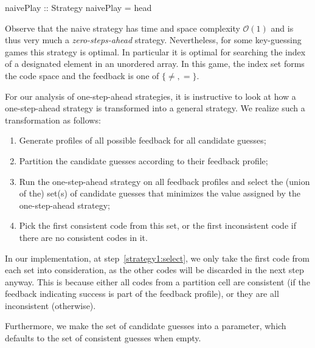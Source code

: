 \documentclass[a4paper]{article}
\theoremstyle{definition}
\newcommand{\bigO}{\mathcal{O}}
\begin{document}
\begin{code}
naivePlay :: Strategy
naivePlay = head
\end{code}

Observe that the naive strategy has time and space complexity $\bigO(1)$ and is thus very much a \emph{zero-steps-ahead} strategy.
Nevertheless, for some key-guessing games this strategy is optimal.
In particular it is optimal for searching the index of a designated element in an unordered array.
In this game, the index set forms the code space and the feedback is one of $\{\ne, =\}$.

For our analysis of one-step-ahead strategies, it is instructive to look at how a one-step-ahead strategy is transformed into a general strategy.
We realize such a transformation as follows:
\begin{enumerate}
\item
  Generate profiles of all possible feedback for all candidate guesses;
\item
  Partition the candidate guesses according to their feedback profile;
\item\label{strategy1:select}
  Run the one-step-ahead strategy on all feedback profiles and select the (union of the) set(s) of candidate guesses that minimizes the value assigned by the one-step-ahead strategy;
\item
  Pick the first consistent code from this set, or the first inconsistent code if there are no consistent codes in it.
\end{enumerate}

In our implementation, at step~\ref{strategy1:select}, we only take the first code from each set into consideration, as the other codes will be discarded in the next step anyway.
This is because either all codes from a partition cell are consistent (if the feedback indicating success is part of the feedback profile), or they are all inconsistent (otherwise).

Furthermore, we make the set of candidate guesses into a parameter, which defaults to the set of consistent guesses when empty.

\end{document}
